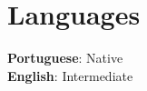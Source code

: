 \documentclass[letterpaper,11pt]{article}
\begin{document}
\section{Languages}
 \begin{itemize}[leftmargin=0.15in, label={}]
    \small{\item{
     \textbf{Portuguese}{: Native} \\
     \textbf{English}{: Intermediate}
    }}
 \end{itemize}
\end{document}
